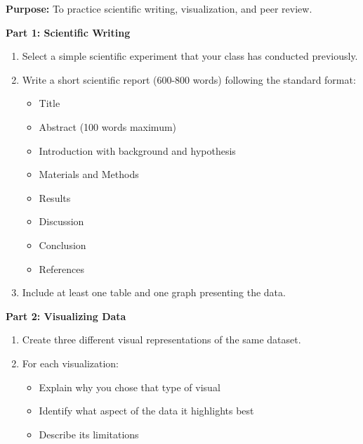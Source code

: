 \documentclass[justified,notoc]{tufte-book}
\newenvironment{investigation}[1]{%
    \begin{tcolorbox}[colback=info!10,colframe=info,title=\textbf{Investigation: #1}]
}{%
    \end{tcolorbox}
}
\begin{document}
\begin{investigation}{Scientific Communication and Peer Review}
\textbf{Purpose:} To practice scientific writing, visualization, and peer review.

\textbf{Part 1: Scientific Writing}
\begin{enumerate}
    \item Select a simple scientific experiment that your class has conducted previously.
    \item Write a short scientific report (600-800 words) following the standard format:
    \begin{itemize}
        \item Title
        \item Abstract (100 words maximum)
        \item Introduction with background and hypothesis
        \item Materials and Methods
        \item Results
        \item Discussion
        \item Conclusion
        \item References
    \end{itemize}
    \item Include at least one table and one graph presenting the data.
\end{enumerate}

\textbf{Part 2: Visualizing Data}
\begin{enumerate}
    \item Create three different visual representations of the same dataset.
    \item For each visualization:
    \begin{itemize}
        \item Explain why you chose that type of visual
        \item Identify what aspect of the data it highlights best
        \item Describe its limitations
    \end{itemize}
\end{enumerate}


\end{investigation}
\end{document}
